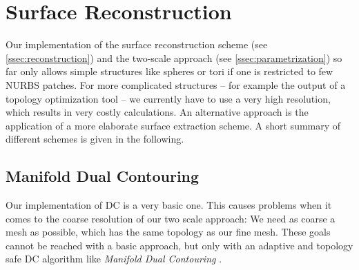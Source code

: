 \chapter{Surface Reconstruction}
\label{appx:AltSurfRecon}
Our implementation of the surface reconstruction scheme (see \autoref{ssec:reconstruction}) and the two-scale approach (see \autoref{ssec:parametrization}) so far only allows simple structures like spheres or tori if one is restricted to few NURBS patches. For more complicated structures -- for example the output of a topology optimization tool -- we currently have to use a very high resolution, which results in very costly calculations. An alternative approach is the application of a more elaborate surface extraction scheme. A short summary of different schemes is given in the following.

\section{Manifold Dual Contouring}
Our implementation of \ac{DC} is a very basic one. This causes problems when it comes to the coarse resolution of our two scale approach: We need as coarse a mesh as possible, which has the same topology as our fine mesh. These goals cannot be reached with a basic approach, but only with an adaptive and topology safe \ac{DC} algorithm like \emph{Manifold Dual Contouring} \cite{Schaefer2007}.

